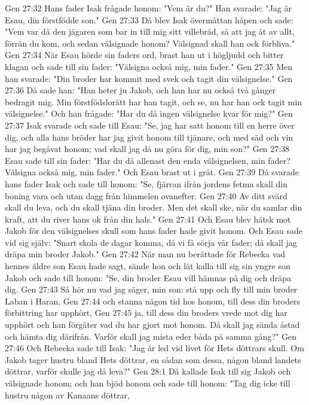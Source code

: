 Gen 27:32  Hans fader Isak frågade honom: "Vem är du?" Han svarade: "Jag är Esau, din förstfödde son."
Gen 27:33  Då blev Isak övermåttan häpen och sade: "Vem var då den jägaren som bar in till mig sitt villebråd, så att jag åt av allt, förrän du kom, och sedan välsignade honom? Välsignad skall han ock förbliva."
Gen 27:34  När Esau hörde sin faders ord, brast han ut i högljudd och bitter klagan och sade till sin fader: "Välsigna också mig, min fader."
Gen 27:35  Men han svarade: "Din broder har kommit med svek och tagit din välsignelse."
Gen 27:36  Då sade han: "Han heter ju Jakob, och han har nu också två gånger bedragit mig. Min förstfödslorätt har han tagit, och se, nu har han ock tagit min välsignelse." Och han frågade: "Har du då ingen välsignelse kvar för mig?"
Gen 27:37  Isak svarade och sade till Esau: "Se, jag har satt honom till en herre över dig, och alla hans bröder har jag givit honom till tjänare, och med säd och vin har jag begåvat honom; vad skall jag då nu göra för dig, min son?"
Gen 27:38  Esau sade till sin fader: "Har du då allenast den enda välsignelsen, min fader? Välsigna också mig, min fader." Och Esau brast ut i gråt.
Gen 27:39  Då svarade hans fader Isak och sade till honom: "Se, fjärran ifrån jordens fetma skall din boning vara och utan dagg från himmelen ovanefter.
Gen 27:40  Av ditt svärd skall du leva, och du skall tjäna din broder. Men det skall ske, när du samlar din kraft, att du river hans ok från din hals."
Gen 27:41  Och Esau blev hätsk mot Jakob för den välsignelses skull som hans fader hade givit honom. Och Esau sade vid sig själv: "Snart skola de dagar komma, då vi få sörja vår fader; då skall jag dräpa min broder Jakob."
Gen 27:42  När man nu berättade för Rebecka vad hennes äldre son Esau hade sagt, sände hon och lät kalla till sig sin yngre son Jakob och sade till honom: "Se, din broder Esau vill hämnas på dig och dräpa dig.
Gen 27:43  Så hör nu vad jag säger, min son: stå upp och fly till min broder Laban i Haran,
Gen 27:44  och stanna någon tid hos honom, till dess din broders förbittring har upphört,
Gen 27:45  ja, till dess din broders vrede mot dig har upphört och han förgäter vad du har gjort mot honom. Då skall jag sända åstad och hämta dig därifrån. Varför skall jag mista eder båda på samma gång?"
Gen 27:46  Och Rebecka sade till Isak: "Jag är led vid livet för Hets döttrars skull. Om Jakob tager hustru bland Hets döttrar, en sådan som dessa, någon bland landets döttrar, varför skulle jag då leva?"
Gen 28:1  Då kallade Isak till sig Jakob och välsignade honom; och han bjöd honom och sade till honom: "Tag dig icke till hustru någon av Kanaans döttrar,

